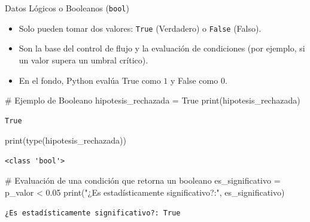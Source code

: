 \documentclass[
  ignorenonframetext,
  aspectratio=169,
  spanish,
]{beamer}
\newenvironment{Shaded}{\begin{snugshade}}{\end{snugshade}}
\newcommand{\BuiltInTok}[1]{\textcolor[rgb]{0.00,0.23,0.31}{#1}}
\newcommand{\CommentTok}[1]{\textcolor[rgb]{0.37,0.37,0.37}{#1}}
\newcommand{\FloatTok}[1]{\textcolor[rgb]{0.68,0.00,0.00}{#1}}
\newcommand{\NormalTok}[1]{\textcolor[rgb]{0.00,0.23,0.31}{#1}}
\newcommand{\OperatorTok}[1]{\textcolor[rgb]{0.37,0.37,0.37}{#1}}
\newcommand{\StringTok}[1]{\textcolor[rgb]{0.13,0.47,0.30}{#1}}
\newcommand{\VariableTok}[1]{\textcolor[rgb]{0.07,0.07,0.07}{#1}}
\begin{document}
\begin{frame}[fragile]{Datos Lógicos o Booleanos (\texttt{bool})}
\label{datos-luxf3gicos-o-booleanos-bool}
\begin{itemize}
\item
  Solo pueden tomar dos valores: \texttt{True} (Verdadero) o
  \texttt{False} (Falso).
\item
  Son la base del control de flujo y la evaluación de condiciones (por
  ejemplo, si un valor supera un umbral crítico).
\item
  En el fondo, Python evalúa True como \(1\) y False como \(0\).
\end{itemize}

\begin{Shaded}
\begin{Highlighting}[]
\CommentTok{\# Ejemplo de Booleano}
\NormalTok{hipotesis\_rechazada }\OperatorTok{=} \VariableTok{True}
\BuiltInTok{print}\NormalTok{(hipotesis\_rechazada)}
\end{Highlighting}
\end{Shaded}

\begin{verbatim}
True
\end{verbatim}

\begin{Shaded}
\begin{Highlighting}[]
\BuiltInTok{print}\NormalTok{(}\BuiltInTok{type}\NormalTok{(hipotesis\_rechazada))}
\end{Highlighting}
\end{Shaded}

\begin{verbatim}
<class 'bool'>
\end{verbatim}

\begin{Shaded}
\begin{Highlighting}[]
\CommentTok{\# Evaluación de una condición que retorna un booleano}
\NormalTok{es\_significativo }\OperatorTok{=}\NormalTok{ p\_valor }\OperatorTok{\textless{}} \FloatTok{0.05}
\BuiltInTok{print}\NormalTok{(}\StringTok{"¿Es estadísticamente significativo?:"}\NormalTok{, es\_significativo)}
\end{Highlighting}
\end{Shaded}

\begin{verbatim}
¿Es estadísticamente significativo?: True
\end{verbatim}
\end{frame}
\end{document}
